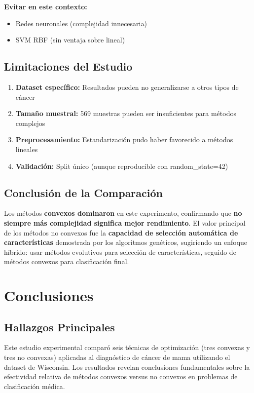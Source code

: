 \documentclass[12pt,a4paper]{article}
\begin{document}
\textbf{Evitar en este contexto:}
\begin{itemize}
    \item Redes neuronales (complejidad innecesaria)
    \item SVM RBF (sin ventaja sobre lineal)
\end{itemize}

\subsection{Limitaciones del Estudio}

\begin{enumerate}
    \item \textbf{Dataset específico:} Resultados pueden no generalizarse a otros tipos de cáncer
    \item \textbf{Tamaño muestral:} 569 muestras pueden ser insuficientes para métodos complejos
    \item \textbf{Preprocesamiento:} Estandarización pudo haber favorecido a métodos lineales
    \item \textbf{Validación:} Split único (aunque reproducible con random\_state=42)
\end{enumerate}

\subsection{Conclusión de la Comparación}

Los métodos \textbf{convexos dominaron} en este experimento, confirmando que \textbf{no siempre más complejidad significa mejor rendimiento}. El valor principal de los métodos no convexos fue la \textbf{capacidad de selección automática de características} demostrada por los algoritmos genéticos, sugiriendo un enfoque híbrido: usar métodos evolutivos para selección de características, seguido de métodos convexos para clasificación final.

\section{Conclusiones}

\subsection{Hallazgos Principales}

Este estudio experimental comparó seis técnicas de optimización (tres convexas y tres no convexas) aplicadas al diagnóstico de cáncer de mama utilizando el dataset de Wisconsin. Los resultados revelan conclusiones fundamentales sobre la efectividad relativa de métodos convexos versus no convexos en problemas de clasificación médica.
\end{document}
